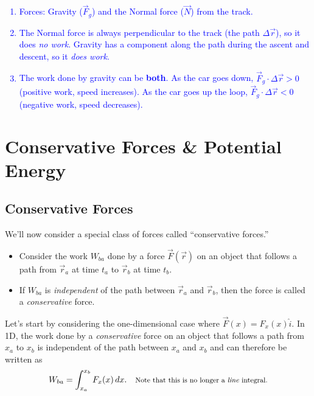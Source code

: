 \documentclass[11pt, letterpaper, openany]{book}
\newenvironment{exercise}[1][Exercise]{%
  \tcolorbox[blanker, breakable, left=1em,
    before skip=1em, after skip=1em,
    borderline west={3pt}{0pt}{PhysNavy},
    colback=PhysCream,
    before upper={\textcolor{PhysNavy}{\sffamily\bfseries #1:}\space}
  ]%
}{%
  \endtcolorbox%
}
\begin{document}
\begin{exercise}[Exercise 3]
\begin{center}
\end{center}
\textcolor{blue}{
\begin{enumerate}[label=\alph*.]
    \item Forces: Gravity ($\vec{F}_g$) and the Normal force ($\vec{N}$) from the track.
    \item The Normal force is always perpendicular to the track (the path $\Delta\vec{r}$), so it does \textit{no work}. Gravity has a component along the path during the ascent and descent, so it \textit{does work}.
    \item The work done by gravity can be \textbf{both}. As the car goes down, $\vec{F}_g \cdot \Delta\vec{r} > 0$ (positive work, speed increases). As the car goes up the loop, $\vec{F}_g \cdot \Delta\vec{r} < 0$ (negative work, speed decreases).
\end{enumerate}
}
\end{exercise}

\chapter{Conservative Forces \& Potential Energy}

\section*{Conservative Forces}

We'll now consider a special class of forces called ``conservative forces.''
\begin{itemize}
    \item Consider the work $W_{ba}$ done by a force $\vec{F}(\vec{r})$ on an object that follows a path from $\vec{r}_a$ at time $t_a$ to $\vec{r}_b$ at time $t_b$.
    \item If $W_{ba}$ is \textit{independent} of the path between $\vec{r}_a$ and $\vec{r}_b$, then the force is called a \textit{conservative} force.
\end{itemize}

Let's start by considering the one-dimensional case where $\vec{F}(x) = F_x(x)\hat{i}$. In 1D, the work done by a \textit{conservative} force on an object that follows a path from $x_a$ to $x_b$ is independent of the path between $x_a$ and $x_b$ and can therefore be written as
\[ W_{ba} = \int_{x_a}^{x_b} F_x(x)\,dx. \quad \text{\footnotesize{Note that this is no longer a \textit{line} integral.}} \]
\end{document}
